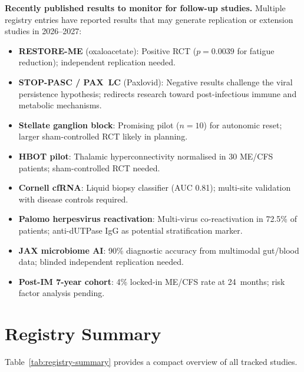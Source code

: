 \textbf{Recently published results to monitor for follow-up studies.}
Multiple registry entries have reported results that may generate
replication or extension studies in 2026--2027:
\begin{itemize}
    \item \textbf{RESTORE-ME} (oxaloacetate): Positive RCT ($p=0.0039$ for
        fatigue reduction); independent replication needed.
    \item \textbf{STOP-PASC / PAX~LC} (Paxlovid): Negative results challenge
        the viral persistence hypothesis; redirects research toward
        post-infectious immune and metabolic mechanisms.
    \item \textbf{Stellate ganglion block}: Promising pilot ($n=10$) for
        autonomic reset; larger sham-controlled RCT likely in planning.
    \item \textbf{HBOT pilot}: Thalamic hyperconnectivity normalised in 30
        ME/CFS patients; sham-controlled RCT needed.
    \item \textbf{Cornell cfRNA}: Liquid biopsy classifier (AUC 0.81);
        multi-site validation with disease controls required.
    \item \textbf{Palomo herpesvirus reactivation}: Multi-virus co-reactivation
        in 72.5\% of patients; anti-dUTPase IgG as potential stratification
        marker.
    \item \textbf{JAX microbiome AI}: 90\% diagnostic accuracy from multimodal
        gut/blood data; blinded independent replication needed.
    \item \textbf{Post-IM 7-year cohort}: 4\% locked-in ME/CFS rate at
        24~months; risk factor analysis pending.
\end{itemize}

\section{Registry Summary}
\label{sec:registry-summary}

Table~\ref{tab:registry-summary} provides a compact overview of all tracked
studies.

